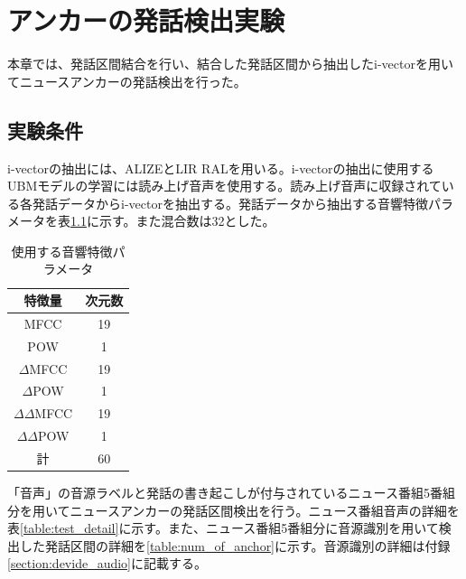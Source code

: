 \chapter{アンカーの発話検出実験}
\label{chapter:get_anchor}
本章では、発話区間結合を行い、結合した発話区間から抽出したi-vectorを用いてニュースアンカーの発話検出を行った。

\section{実験条件}
i-vectorの抽出には、ALIZEとLIR RAL\cite{alize}を用いる。i-vectorの抽出に使用するUBMモデルの学習には読み上げ音声\cite{ATR}を使用する。読み上げ音声に収録されている各発話データからi-vectorを抽出する。発話データから抽出する音響特徴パラメータを表\ref{iv_feature2}に示す。また混合数は32とした。\par

\begin{table}[H]
  \begin{center}
    \caption{使用する音響特徴パラメータ \label{iv_feature2}}
    \begin{tabular}{|c||c|} \hline
      特徴量 & 次元数\\ \hline
      MFCC & 19  \\ 
      POW & 1  \\ 
      $\Delta$MFCC & 19 \\ 
      $\Delta$POW & 1 \\ 
      $\Delta\Delta$MFCC & 19 \\ 
      $\Delta\Delta$POW & 1 \\ \hline
      計 & 60 \\ \hline
    \end{tabular}
  \end{center}
\end{table}

\vspace{0.2in}\par
「音声」の音源ラベルと発話の書き起こしが付与されているニュース番組5番組分を用いてニュースアンカーの発話区間検出を行う。ニュース番組音声の詳細を表\ref{table:test_detail}に示す。また、ニュース番組5番組分に音源識別を用いて検出した発話区間の詳細を\ref{table:num_of_anchor}に示す。音源識別の詳細は付録\ref{section:devide_audio}に記載する。

